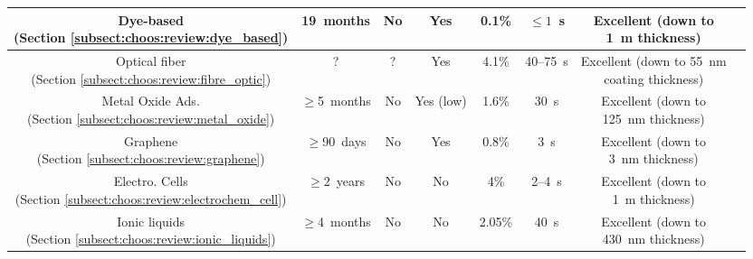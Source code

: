 {\begin{landscape}
\begin{table}
\begin{adjustbox}{center}
\begin{tabular}{c|c|c|c|c|c|c|c}
		\specialcell{Dye-based\\(Section \ref{subsect:choos:review:dye_based})} & 19~months & No & Yes & 0.1\% & $\leq1$~s & \specialcell{Excellent (down to\\1~\textmu{}m thickness)} & \specialcell{\cite{mills1997, mills2009, dansby2010, atamanchuk2014}\\\cite{fernandezramos2018, fernandezramos2019}} \\ \hline
		
		\specialcell{Optical fiber\\(Section \ref{subsect:choos:review:fibre_optic})} & ? & ? & Yes & 4.1\% & 40--75~s & \specialcell{Excellent (down to 55~nm\\coating thickness)} & \cite{melo2014, chong2015, hromadka2018}\\ \hline
		
		\specialcell{Metal Oxide Ads.\\(Section \ref{subsect:choos:review:metal_oxide})} & $\geq$5~months & No & Yes (low) & 1.6\% & 30~s & \specialcell{Excellent (down to\\ 125~nm thickness)} & \specialcell{\cite{ishihara1993, mizuno1993, ishihara1995, haeusler1996}\\ \cite{herran2009, jeong2016, joshi2020}}\\ \hline
		
		\specialcell{Graphene\\(Section \ref{subsect:choos:review:graphene})} & $\geq$90~days & No & Yes & 0.8\% & 3~s & \specialcell{Excellent (down to\\ 3~nm thickness)} & \cite{yoon2011, shaban2019, akhter2021}\\ \hline
		
		\specialcell{Electro. Cells\\(Section \ref{subsect:choos:review:electrochem_cell})} & $\geq$2~years & No & No & 4\% & 2--4~s & \specialcell{Excellent (down to\\1~\textmu{}m thickness)} & \cite{kaneyasu2000, lee2009li, choi2013, lee2014}\\ \hline
		
		\specialcell{Ionic liquids\\(Section \ref{subsect:choos:review:ionic_liquids})} & $\geq$4~months & No & No & 2.05\% & 40~s & \specialcell{Excellent (down to\\ 430~nm thickness)} & \specialcell{\cite{chen2011, mineo2012, willa2015}\\ \cite{revsbech2019, fapyane2020}}\\ \hline
		

\end{tabular}
\end{adjustbox}
\end{table}
\end{landscape}}
